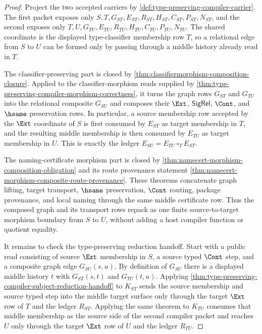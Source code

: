 \begin{proof}
Project the two accepted carriers by \autoref{def:type-preserving-compiler-carrier}. The first packet exposes only $S,T,G_{ST},E_{ST},R_{ST},H_{ST},C_{ST},P_{ST},N_{ST}$, and the second exposes only $T,U,G_{TU},E_{TU},R_{TU},H_{TU},C_{TU},P_{TU},N_{TU}$. The shared coordinate is the displayed type-classifier membership row $T$, so a relational edge from $S$ to $U$ can be formed only by passing through a middle history already read in $T$.

The classifier-preserving part is closed by \autoref{thm:classifiermorphism-composition-closure}. Applied to the classifier-morphism reads supplied by \autoref{thm:type-preserving-compiler-morphism-correctness}, it turns the graph rows $G_{ST}$ and $G_{TU}$ into the relational composite $G_{SU}$ and composes their $\Ext$, $\mathsf{SigRel}$, $\Cont$, and $\hsame$ preservation rows. In particular, a source membership row accepted by the $\Ext$ coordinate of $S$ is first consumed by $E_{ST}$ as target membership in $T$, and the resulting middle membership is then consumed by $E_{TU}$ as target membership in $U$. This is exactly the ledger $E_{SU}=E_{TU}\circ_T E_{ST}$.

The naming-certificate morphism part is closed by \autoref{thm:namecert-morphism-composition-obligation} and its route provenance statement \autoref{thm:namecert-morphism-composite-route-provenance}. These theorems concatenate graph lifting, target transport, $\hsame$ preservation, $\Cont$ routing, package provenance, and local naming through the same middle certificate row. Thus the composed graph and its transport rows repack as one finite source-to-target morphism boundary from $S$ to $U$, without adding a host compiler function or quotient equality.

It remains to check the type-preserving reduction handoff. Start with a public read consisting of source $\Ext$ membership in $S$, a source typed $\Cont$ step, and a composite graph edge $G_{SU}(s,u)$. By definition of $G_{SU}$ there is a displayed middle history $t$ with $G_{ST}(s,t)$ and $G_{TU}(t,u)$. Applying \autoref{thm:type-preserving-compiler-subject-reduction-handoff} to $K_{ST}$ sends the source membership and source typed step into the middle target surface only through the target $\Ext$ row of $T$ and the ledger $R_{ST}$. Applying the same theorem to $K_{TU}$ consumes that middle membership as the source side of the second compiler packet and reaches $U$ only through the target $\Ext$ row of $U$ and the ledger $R_{TU}$.


\end{proof}
